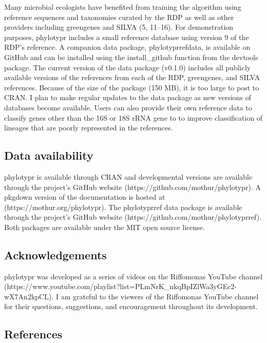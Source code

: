 \documentclass[
  11pt,
]{article}
\begin{document}
Many microbial ecologists have benefited from training the algorithm
using reference sequences and taxonomies curated by the RDP as well as
other providers including greengenes and SILVA (5, 11--16). For
demonstration purposes, phylotypr includes a small reference database
using version 9 of the RDP's reference. A companion data package,
phylotyprrefdata, is available on GitHub and can be installed using the
install\_github function from the devtools package. The current version
of the data package (v0.1.0) includes all publicly available versions of
the references from each of the RDP, greengenes, and SILVA references.
Because of the size of the package (150 MB), it is too large to post to
CRAN. I plan to make regular updates to the data package as new versions
of databases become available. Users can also provide their own
reference data to classify genes other than the 16S or 18S rRNA gene to
to improve classification of lineages that are poorly represented in the
references.

\subsection{Data availability}\label{data-availability}

phylotypr is available through CRAN and developmental versions are
available through the project's GitHub website
(https://github.com/mothur/phylotypr). A pkgdown version of the
documentation is hosted at (https://mothur.org/phylotypr). The
phylotyprref data package is available through the project's GitHub
website (https://github.com/mothur/phylotyprref). Both packages are
available under the MIT open source license.

\subsection{Acknowledgements}\label{acknowledgements}

phylotypr was developed as a series of videos on the Riffomonas YouTube
channel
(https://www.youtube.com/playlist?list=PLmNrK\_nkqBpIZlWa3yGEc2-wX7An2kpCL).
I am grateful to the viewers of the Riffomonas YouTube channel for their
questions, suggestions, and encouragement throughout its development.

\newpage

\subsection{References}\label{references}
\end{document}
